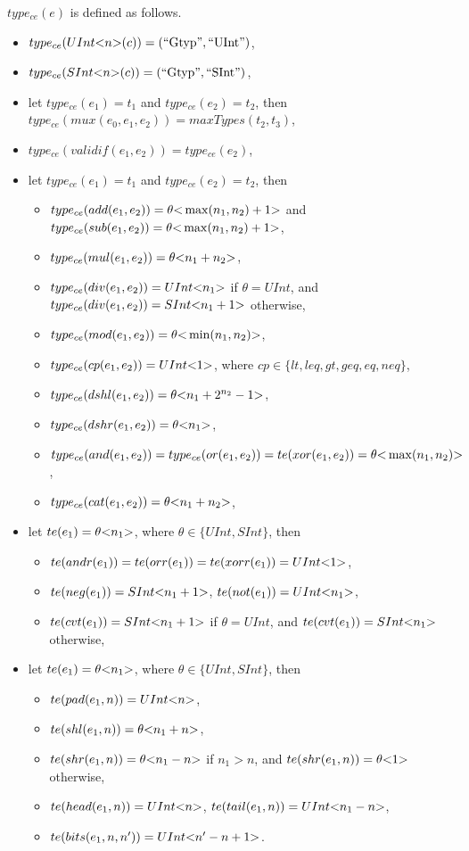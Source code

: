 {$type_{ce}(e)$ is defined as follows. 
\begin{itemize}
\item $type_{ce}(UInt\mbox{<}n\mbox{>}(c)) = (\mbox{``Gtyp''}, \mbox{``UInt''})$, 
%
\item $type_{ce}(SInt\mbox{<}n\mbox{>}(c)) = (\mbox{``Gtyp''}, \mbox{``SInt''})$, 
%
\item let $type_{ce}(e_1) = t_1$ and $type_{ce}(e_2) = t_2$, then $type_{ce}(mux(e_0, e_1, e_2)) = maxTypes(t_2, t_3)$,
%
\item $type_{ce}(validif(e_1, e_2)) = type_{ce}(e_2)$,
%
\item let $type_{ce}(e_1) =t_1$ and $type_{ce}(e_2) = t_2$, then 
\begin{itemize}
\item $type_{ce}(add(e_1, e_2)) =\theta \mbox{<} \max(n_1, n_2)+1 \mbox{>}$ and $type_{ce}(sub(e_1, e_2)) = \theta \mbox{<} \max(n_1, n_2)+1 \mbox{>}$, 
%
\item $type_{ce}(mul(e_1, e_2)) = \theta \mbox{<} n_1+n_2 \mbox{>}$,
%
\item $type_{ce}(div(e_1, e_2)) = UInt \mbox{<} n_1 \mbox{>}$ if $\theta = UInt$, and $type_{ce}(div(e_1, e_2)) = SInt \mbox{<} n_1+1 \mbox{>}$ otherwise,
%
\item $type_{ce}(mod(e_1, e_2)) = \theta \mbox{<} \min(n_1,n_2) \mbox{>}$,
%
\item $type_{ce}(cp(e_1, e_2)) = UInt \mbox{<} 1 \mbox{>}$, where $cp \in \{lt, leq, gt, geq, eq, neq\}$,
%
\item $type_{ce}(dshl(e_1, e_2)) = \theta \mbox{<} n_1+2^{n_2}-1 \mbox{>}$, 
%
\item $type_{ce}(dshr(e_1, e_2)) = \theta \mbox{<} n_1 \mbox{>}$, 
%
\item $type_{ce}(and(e_1, e_2)) = type_{ce}(or(e_1, e_2)) =  te(xor(e_1, e_2)) = \theta \mbox{<} \max(n_1, n_2) \mbox{>}$, 
%
\item $type_{ce}(cat(e_1, e_2)) = \theta \mbox{<} n_1 + n_2 \mbox{>}$, 
\end{itemize}
%
\item let $te(e_1) = \theta \mbox{<} n_1 \mbox{>}$, where $\theta \in \{UInt, SInt\}$, then 
\begin{itemize}
\item $te(andr(e_1)) = te(orr(e_1)) =  te(xorr(e_1)) = UInt\mbox{<}1\mbox{>}$,
%
\item $te(neg(e_1)) = SInt\mbox{<}n_1 +1\mbox{>}$, $te(not(e_1)) =  UInt\mbox{<}n_1\mbox{>}$, 
%
\item $te(cvt(e_1)) = SInt\mbox{<}n_1 +1\mbox{>}$ if $\theta = UInt$, and $te(cvt(e_1)) =  SInt\mbox{<}n_1\mbox{>}$ otherwise,  
\end{itemize}
%
\item let $te(e_1) = \theta \mbox{<} n_1 \mbox{>}$, where $\theta \in \{UInt, SInt\}$, then
\begin{itemize}
\item $te(pad(e_1, n)) = UInt\mbox{<}n\mbox{>}$,
%
\item $te(shl(e_1,n)) = \theta \mbox{<} n_1 + n \mbox{>}$,  
%
\item $te(shr(e_1, n)) = \theta \mbox{<} n_1-n \mbox{>}$ if $n_1 > n$, and $te(shr(e_1, n)) =  \theta \mbox{<} 1 \mbox{>}$ otherwise,  
%
\item $te(head(e_1, n)) = UInt\mbox{<}n\mbox{>}$, $te(tail(e_1, n)) = UInt\mbox{<}n_1-n\mbox{>}$, 
%
\item $te(bits(e_1, n, n')) = UInt\mbox{<}n'-n+1\mbox{>}$.  
\end{itemize} 
%
\end{itemize}
}
